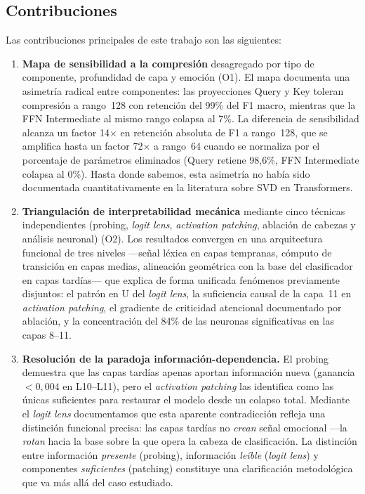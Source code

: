 \subsection{Contribuciones}
\label{sec:contribuciones-intro}

Las contribuciones principales de este trabajo son las siguientes:

\begin{enumerate}[label=\textbf{C\arabic*.}]

    \item \textbf{Mapa de sensibilidad a la compresión} desagregado por tipo de
    componente, profundidad de capa y emoción (O1). El mapa documenta una
    asimetría radical entre componentes: las proyecciones Query y Key toleran
    compresión a rango~128 con retención del 99\% del F1 macro, mientras que la
    FFN Intermediate al mismo rango colapsa al 7\%. La diferencia de
    sensibilidad alcanza un factor 14$\times$ en retención absoluta de F1 a
    rango~128, que se amplifica hasta un factor 72$\times$ a rango~64
    cuando se normaliza por el porcentaje de parámetros eliminados (Query
    retiene 98{,}6\%, FFN Intermediate colapsa al 0\%). Hasta donde sabemos,
    esta asimetría no había sido documentada cuantitativamente en la
    literatura sobre SVD en Transformers.

    \item \textbf{Triangulación de interpretabilidad mecánica} mediante cinco
    técnicas independientes (probing, \emph{logit lens}, \emph{activation patching}, ablación
    de cabezas y análisis neuronal) (O2). Los resultados convergen en una
    arquitectura funcional de tres niveles ---señal léxica en capas tempranas,
    cómputo de transición en capas medias, alineación geométrica con la base
    del clasificador en capas tardías--- que explica de forma unificada
    fenómenos previamente disjuntos: el patrón en U del \emph{logit lens}, la
    suficiencia causal de la capa~11 en \emph{activation patching}, el gradiente de
    criticidad atencional documentado por ablación, y la concentración del 84\%
    de las neuronas significativas en las capas 8--11.

    \item \textbf{Resolución de la paradoja información-dependencia.} El
    probing demuestra que las capas tardías apenas aportan información nueva
    (ganancia $<0{,}004$ en L10--L11), pero el \emph{activation patching} las
    identifica como las únicas suficientes para restaurar el modelo desde un
    colapso total. Mediante el \emph{logit lens} documentamos que esta aparente
    contradicción refleja una distinción funcional precisa: las capas tardías
    no \emph{crean} señal emocional ---la \emph{rotan} hacia la base sobre la
    que opera la cabeza de clasificación. La distinción entre información
    \emph{presente} (probing), información \emph{leíble} (\emph{logit lens}) y
    componentes \emph{suficientes} (patching) constituye una clarificación
    metodológica que va más allá del caso estudiado.


\end{enumerate}
